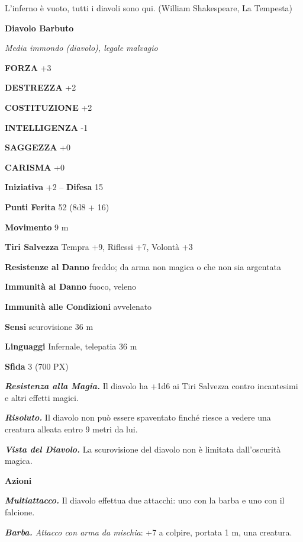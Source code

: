 \begin{multicols}{2}
	\begin{changemargin}{0.3cm}{0.3cm}\begin{enfasi}{L'inferno è vuoto, tutti i diavoli sono qui. (William Shakespeare, La Tempesta)}\end{enfasi}\end{changemargin}\medskip

	\medskip{}\textbf{Diavolo Barbuto}

	\textit{Media immondo (diavolo), legale malvagio}

	\textbf{FORZA} +3

	\textbf{DESTREZZA} +2

	\textbf{COSTITUZIONE} +2

	\textbf{INTELLIGENZA} -1

	\textbf{SAGGEZZA} +0

	\textbf{CARISMA} +0

	\textbf{Iniziativa} +2 -- \textbf{Difesa} 15

	\textbf{Punti Ferita} 52 (8d8 + 16)

	\textbf{Movimento} 9 m

	\textbf{Tiri Salvezza} Tempra +9, Riflessi +7, Volontà +3

	\textbf{Resistenze al Danno} freddo; da arma non magica o che non sia argentata

	\textbf{Immunità al Danno} fuoco, veleno

	\textbf{Immunità alle Condizioni} avvelenato

	\textbf{Sensi} scurovisione 36 m

	\textbf{Linguaggi} Infernale, telepatia 36 m

	\textbf{Sfida} 3 (700 PX)

	\textit{\textbf{Resistenza alla Magia.}} Il diavolo ha +1d6 ai Tiri Salvezza contro incantesimi e altri effetti magici.

	\textit{\textbf{Risoluto.}} Il diavolo non può essere spaventato finché riesce a vedere una creatura alleata entro 9 metri da lui.

	\textit{\textbf{Vista del Diavolo.}} La scurovisione del diavolo non è limitata dall'oscurità magica.

	\textbf{Azioni}

	\textit{\textbf{Multiattacco.}} Il diavolo effettua due attacchi: uno con la barba e uno con il falcione.

	\textit{\textbf{Barba.} Attacco con arma da mischia}: +7 a colpire, portata 1 m, una creatura.


\end{multicols}
